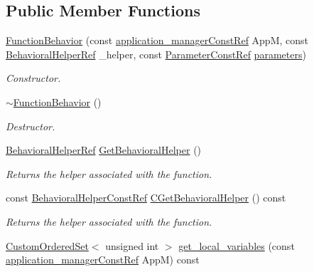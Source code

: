 \subsection*{Public Member Functions}
\begin{DoxyCompactItemize}
\item 
\hyperlink{classFunctionBehavior_a1cf338a36811ebac226839fa375f9c34}{Function\+Behavior} (const \hyperlink{application__manager_8hpp_abb985163a2a3fb747f6f03b1eaadbb44}{application\+\_\+manager\+Const\+Ref} AppM, const \hyperlink{behavioral__helper_8hpp_a9da8798985d185e76cbde965d9d68f84}{Behavioral\+Helper\+Ref} \+\_\+helper, const \hyperlink{Parameter_8hpp_a37841774a6fcb479b597fdf8955eb4ea}{Parameter\+Const\+Ref} \hyperlink{classFunctionBehavior_a8a568943fd66b40da9b58df7d3fc4da0}{parameters})
\begin{DoxyCompactList}\small\item\em Constructor. \end{DoxyCompactList}\item 
\hyperlink{classFunctionBehavior_a0a1df3ea16cfa54cc1e22053d320f512}{$\sim$\+Function\+Behavior} ()
\begin{DoxyCompactList}\small\item\em Destructor. \end{DoxyCompactList}\item 
\hyperlink{behavioral__helper_8hpp_a9da8798985d185e76cbde965d9d68f84}{Behavioral\+Helper\+Ref} \hyperlink{classFunctionBehavior_adc1e32d1edb7233a6bfd3aa413a80077}{Get\+Behavioral\+Helper} ()
\begin{DoxyCompactList}\small\item\em Returns the helper associated with the function. \end{DoxyCompactList}\item 
const \hyperlink{behavioral__helper_8hpp_aae973b54cac87eef3b27442aa3e1e425}{Behavioral\+Helper\+Const\+Ref} \hyperlink{classFunctionBehavior_a084fd6d48df94ccce7451871ebf1e2ab}{C\+Get\+Behavioral\+Helper} () const
\begin{DoxyCompactList}\small\item\em Returns the helper associated with the function. \end{DoxyCompactList}\item 
\hyperlink{classCustomOrderedSet}{Custom\+Ordered\+Set}$<$ unsigned int $>$ \hyperlink{classFunctionBehavior_ae374b1fed33e729569ae9edd0e08de08}{get\+\_\+local\+\_\+variables} (const \hyperlink{application__manager_8hpp_abb985163a2a3fb747f6f03b1eaadbb44}{application\+\_\+manager\+Const\+Ref} AppM) const

\end{DoxyCompactItemize}
